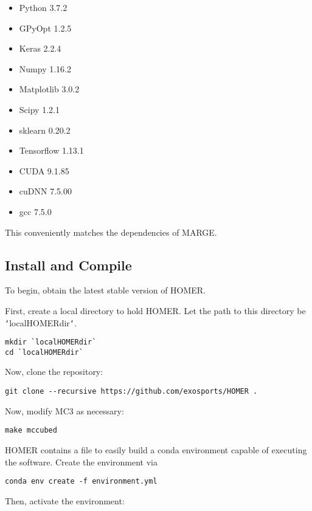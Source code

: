 \documentclass[letterpaper, 12pt]{article}
\begin{document}
\begin{itemize}
\item Python 3.7.2
\item GPyOpt 1.2.5
\item Keras 2.2.4
\item Numpy 1.16.2
\item Matplotlib 3.0.2
\item Scipy 1.2.1
\item sklearn 0.20.2
\item Tensorflow 1.13.1
\item CUDA 9.1.85
\item cuDNN 7.5.00
\item gcc 7.5.0
\end{itemize}

This conveniently matches the dependencies of MARGE.



\subsection{Install and Compile}
\label{sec:install}

\noindent To begin, obtain the latest stable version of HOMER.  

\noindent First, create a local directory to hold HOMER.  Let the path to this 
directory be \texttt{`}localHOMERdir\texttt{`}.

\begin{verbatim}
mkdir `localHOMERdir`
cd `localHOMERdir`
\end{verbatim}

\noindent Now, clone the repository:
\begin{verbatim}
git clone --recursive https://github.com/exosports/HOMER .
\end{verbatim}

\noindent Now, modify MC3 as necessary:

\begin{verbatim}
make mccubed
\end{verbatim}

\noindent HOMER contains a file to easily build a conda environment capable of 
executing the software.  Create the environment via

\begin{verbatim}
conda env create -f environment.yml
\end{verbatim}

\noindent Then, activate the environment:
\end{document}
